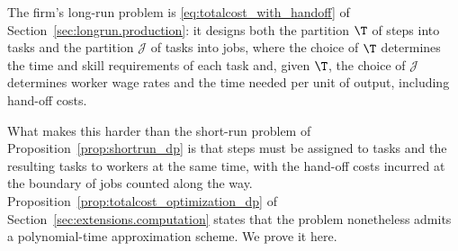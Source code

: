 The firm's long-run problem is \eqref{eq:totalcost_with_handoff} of Section~\ref{sec:longrun.production}: it designs both the partition $\T$ of steps into tasks and the partition $\mathcal{J}$ of tasks into jobs, where the choice of $\T$ determines the time and skill requirements of each task and, given $\T$, the choice of $\mathcal{J}$ determines worker wage rates and the time needed per unit of output, including hand-off costs.

What makes this harder than the short-run problem of Proposition~\ref{prop:shortrun_dp} is that steps must be assigned to tasks and the resulting tasks to workers at the same time, with the hand-off costs incurred at the boundary of jobs counted along the way.
Proposition~\ref{prop:totalcost_optimization_dp} of Section~\ref{sec:extensions.computation} states that the problem nonetheless admits a polynomial-time approximation scheme.
We prove it here.


